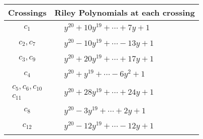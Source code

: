 \documentclass[1p]{elsarticle_modified}
\theoremstyle{definition}
\begin{document}
\begin{tabular}{m{50pt}|m{274pt}}
Crossings & \hspace{64pt}Riley Polynomials at each crossing \\
\hline $$\begin{aligned}c_{1}\end{aligned}$$&$\begin{aligned}
&y^{20}+10 y^{19}+\cdots+7 y+1
\end{aligned}$\\
\hline $$\begin{aligned}c_{2},c_{7}\end{aligned}$$&$\begin{aligned}
&y^{20}-10 y^{19}+\cdots-13 y+1
\end{aligned}$\\
\hline $$\begin{aligned}c_{3},c_{9}\end{aligned}$$&$\begin{aligned}
&y^{20}+20 y^{19}+\cdots+17 y+1
\end{aligned}$\\
\hline $$\begin{aligned}c_{4}\end{aligned}$$&$\begin{aligned}
&y^{20}+y^{19}+\cdots-6 y^2+1
\end{aligned}$\\
\hline $$\begin{aligned}c_{5},c_{6},c_{10}\\c_{11}\end{aligned}$$&$\begin{aligned}
&y^{20}+28 y^{19}+\cdots+24 y+1
\end{aligned}$\\
\hline $$\begin{aligned}c_{8}\end{aligned}$$&$\begin{aligned}
&y^{20}-3 y^{19}+\cdots+2 y+1
\end{aligned}$\\
\hline $$\begin{aligned}c_{12}\end{aligned}$$&$\begin{aligned}
&y^{20}-12 y^{19}+\cdots-12 y+1
\end{aligned}$\\
\hline
\end{tabular}\\~\\
\end{document}
